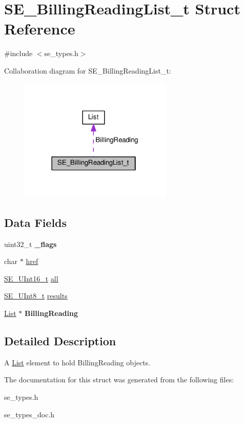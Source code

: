 \hypertarget{structSE__BillingReadingList__t}{}\section{S\+E\+\_\+\+Billing\+Reading\+List\+\_\+t Struct Reference}
\label{structSE__BillingReadingList__t}


{\ttfamily \#include $<$se\+\_\+types.\+h$>$}



Collaboration diagram for S\+E\+\_\+\+Billing\+Reading\+List\+\_\+t\+:\nopagebreak
\begin{figure}[H]
\begin{center}
\leavevmode
\includegraphics[width=207pt]{structSE__BillingReadingList__t__coll__graph}
\end{center}
\end{figure}
\subsection*{Data Fields}
\begin{DoxyCompactItemize}
\item 
uint32\+\_\+t {\bfseries \+\_\+flags}
\item 
char $\ast$ \hyperlink{group__BillingReadingList_gaebc6ad48b2507e612e497bea80757f34}{href}
\item 
\hyperlink{group__UInt16_gac68d541f189538bfd30cfaa712d20d29}{S\+E\+\_\+\+U\+Int16\+\_\+t} \hyperlink{group__BillingReadingList_ga1dcc0d443c7bbbb96df9bf7af537ce2a}{all}
\item 
\hyperlink{group__UInt8_gaf7c365a1acfe204e3a67c16ed44572f5}{S\+E\+\_\+\+U\+Int8\+\_\+t} \hyperlink{group__BillingReadingList_gad0f564641791feb12946e5bc2f729f1b}{results}
\item 
\hyperlink{structList}{List} $\ast$ {\bfseries Billing\+Reading}
\end{DoxyCompactItemize}


\subsection{Detailed Description}
A \hyperlink{structList}{List} element to hold Billing\+Reading objects. 

The documentation for this struct was generated from the following files\+:\begin{DoxyCompactItemize}
\item 
se\+\_\+types.\+h\item 
se\+\_\+types\+\_\+doc.\+h\end{DoxyCompactItemize}
